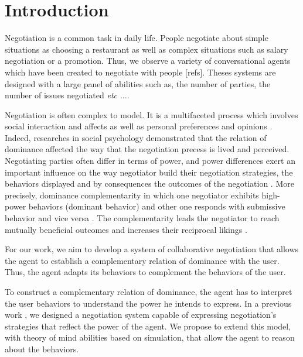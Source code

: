 \documentclass[sigconf]{aamas}  %
\begin{document}
	
	
	\maketitle
	
	
	
	\section{Introduction}
	Negotiation is a common task in daily life. People negotiate about simple situations as choosing a restaurant as well as complex situations such as salary negotiation or a promotion. Thus, we observe a variety of conversational agents which have been created to negotiate with people [refs]. Theses systems are designed with a large panel of abilities such as, the number of parties, the number of issues negotiated \emph{etc $\ldots$}.
	
	Negotiation is often complex to model. It is a multifaceted process which involves social interaction and affects as well as personal preferences and opinions  \cite{bro2010affective}. Indeed, researches in social psychology demonstrated that the relation of dominance affected the way that the negotiation precess is lived and perceived.
	Negotiating parties often differ in terms of power, and power differences exert an important influence on the way negotiator build their negotiation strategies, the behaviors displayed and by consequences the outcomes of the negotiation \cite{van2006power}. More precisely, dominance complementarity in which one negotiator exhibits high-power behaviors (dominant behavior) and other one responds with submissive behavior and vice versa \cite{tiedens2003power}. The complementarity leads the negotiator to reach mutually beneficial outcomes and increases their reciprocal likings \cite{wiltermuth2015benefits,tiedens2003power}.
	
	
	For our work, we aim to develop a system of collaborative negotiation that allows the agent to establish a complementary relation of dominance with the user. Thus, the agent adapts its behaviors to complement the behaviors of the user. 
	
	To construct a complementary relation of dominance, the agent has to interpret the user behaviors to understand the power he intends to express.  In a previous work \cite{ouali2017computational}, we designed a negotiation system capable of expressing negotiation's strategies that reflect the power of the agent. We propose to extend this model, with theory of mind abilities based on simulation, that allow the agent to reason about the behaviors. 
	
\end{document}
